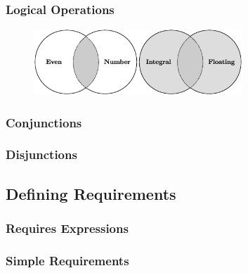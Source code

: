         \newpage

    \subsubsection{Logical Operations} \label{sec:logical_operations}

        \begin{figure}[h]
            \centering
            \includegraphics[width=0.7\textwidth]{figures/logical_operations.eps}
        \end{figure}

        \subsubsection*{Conjunctions} \label{sec:conjunctions}

        

        \subsubsection*{Disjunctions} \label{sec:disjunctions}

        

        \newpage

\subsection{Defining Requirements} \label{sec:defining_requirements}

    \subsubsection{Requires Expressions} \label{sec:requires_expressions}

        

        \subsubsection*{Simple Requirements} \label{sec:simple_requirements}

